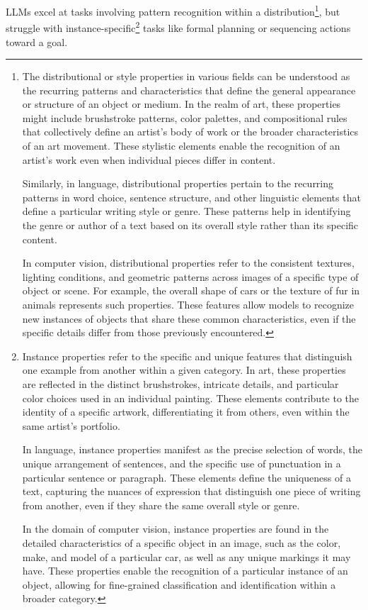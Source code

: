LLMs excel at tasks involving pattern recognition within a distribution\footnote{The distributional or style properties in various fields can be understood as the recurring patterns and characteristics that define the general appearance or structure of an object or medium. In the realm of art, these properties might include brushstroke patterns, color palettes, and compositional rules that collectively define an artist's body of work or the broader characteristics of an art movement. These stylistic elements enable the recognition of an artist's work even when individual pieces differ in content.

	Similarly, in language, distributional properties pertain to the recurring patterns in word choice, sentence structure, and other linguistic elements that define a particular writing style or genre. These patterns help in identifying the genre or author of a text based on its overall style rather than its specific content.

	In computer vision, distributional properties refer to the consistent textures, lighting conditions, and geometric patterns across images of a specific type of object or scene. For example, the overall shape of cars or the texture of fur in animals represents such properties. These features allow models to recognize new instances of objects that share these common characteristics, even if the specific details differ from those previously encountered.
}, but struggle with instance-specific\footnote{
	Instance properties refer to the specific and unique features that distinguish one example from another within a given category. In art, these properties are reflected in the distinct brushstrokes, intricate details, and particular color choices used in an individual painting. These elements contribute to the identity of a specific artwork, differentiating it from others, even within the same artist's portfolio.

	In language, instance properties manifest as the precise selection of words, the unique arrangement of sentences, and the specific use of punctuation in a particular sentence or paragraph. These elements define the uniqueness of a text, capturing the nuances of expression that distinguish one piece of writing from another, even if they share the same overall style or genre.

	In the domain of computer vision, instance properties are found in the detailed characteristics of a specific object in an image, such as the color, make, and model of a particular car, as well as any unique markings it may have. These properties enable the recognition of a particular instance of an object, allowing for fine-grained classification and identification within a broader category.
} tasks like formal planning or sequencing actions toward a goal.
